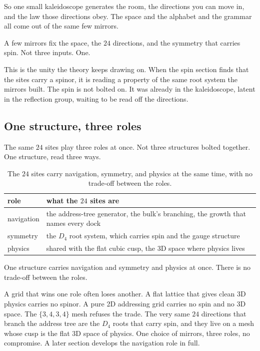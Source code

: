 So one small kaleidoscope generates the room, the directions you can move in, and the law those directions obey. The space and the alphabet and the grammar all come out of the same few mirrors.

\begin{principle}
A few mirrors fix the space, the $24$ directions, and the symmetry that carries spin. Not three inputs. One.
\end{principle}

This is the unity the theory keeps drawing on. When the spin section finds that the sites carry a spinor, it is reading a property of the same root system the mirrors built. The spin is not bolted on. It was already in the kaleidoscope, latent in the reflection group, waiting to be read off the directions.

\subsection{One structure, three roles}

The same $24$ sites play three roles at once. Not three structures bolted together. One structure, read three ways.

\begin{table}[ht]
\centering
\begin{tabular}{@{}ll@{}}
\toprule
role & what the $24$ sites are \\
\midrule
navigation & the address-tree generator, the bulk's branching, the growth that names every dock \\
symmetry & the $D_4$ root system, which carries spin and the gauge structure \\
physics & shared with the flat cubic cusp, the 3D space where physics lives \\
\bottomrule
\end{tabular}
\caption{The $24$ sites carry navigation, symmetry, and physics at the same time, with no trade-off between the roles.}
\label{tab:three-roles}
\end{table}

\begin{result}
One structure carries navigation and symmetry and physics at once. There is no trade-off between the roles.
\end{result}

A grid that wins one role often loses another. A flat lattice that gives clean 3D physics carries no spinor. A pure 2D addressing grid carries no spin and no 3D space. The $\{3,4,3,4\}$ mesh refuses the trade. The very same $24$ directions that branch the address tree are the $D_4$ roots that carry spin, and they live on a mesh whose cusp is the flat 3D space of physics. One choice of mirrors, three roles, no compromise. A later section develops the navigation role in full.

